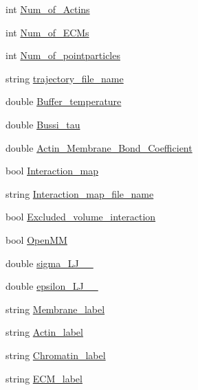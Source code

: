 \begin{DoxyCompactItemize}
\item 
int \mbox{\hyperlink{namespaceGenConst_a74cb3c07acb344ebdeeb885fbdacd13a}{Num\+\_\+of\+\_\+\+Actins}}
\item 
int \mbox{\hyperlink{namespaceGenConst_a70039a764f7a8ef1084d977559fd5c3b}{Num\+\_\+of\+\_\+\+E\+C\+Ms}}
\item 
int \mbox{\hyperlink{namespaceGenConst_aec456997dd27bb5eb5c636fbc78f39fc}{Num\+\_\+of\+\_\+pointparticles}}
\item 
string \mbox{\hyperlink{namespaceGenConst_aadb6de9465987552f3367a893c9f0817}{trajectory\+\_\+file\+\_\+name}}
\item 
double \mbox{\hyperlink{namespaceGenConst_a9deb819215b4b909972f699931e4e155}{Buffer\+\_\+temperature}}
\item 
double \mbox{\hyperlink{namespaceGenConst_aad6835547fc7bc7ef3069986f08e2792}{Bussi\+\_\+tau}}
\item 
double \mbox{\hyperlink{namespaceGenConst_a605feaf5d31899243b6222624163cf29}{Actin\+\_\+\+Membrane\+\_\+\+Bond\+\_\+\+Coefficient}}
\item 
bool \mbox{\hyperlink{namespaceGenConst_ad847e6f5e498c18806f453d643ee8b1e}{Interaction\+\_\+map}}
\item 
string \mbox{\hyperlink{namespaceGenConst_a99a2fa8732b65ec4de1dfaca040a11de}{Interaction\+\_\+map\+\_\+file\+\_\+name}}
\item 
bool \mbox{\hyperlink{namespaceGenConst_a2a8e8f88c2959679b92fc79c94d07ad9}{Excluded\+\_\+volume\+\_\+interaction}}
\item 
bool \mbox{\hyperlink{namespaceGenConst_abcb46238d30411769a54de2a308a9717}{Open\+MM}}
\item 
double \mbox{\hyperlink{namespaceGenConst_a34375d0ec9af3672f5fcbe624044ad8d}{sigma\+\_\+\+L\+J\+\_\+\_}}
\item 
double \mbox{\hyperlink{namespaceGenConst_aed07d4c4a7f92cd150a09f87bdb65b70}{epsilon\+\_\+\+L\+J\+\_\+\_}}
\item 
string \mbox{\hyperlink{namespaceGenConst_acefa162cfa7572ce261245beaa812c9b}{Membrane\+\_\+label}}
\item 
string \mbox{\hyperlink{namespaceGenConst_a9acdda43f7e8ee196130df7f5966e658}{Actin\+\_\+label}}
\item 
string \mbox{\hyperlink{namespaceGenConst_a2614662d6f315ee0639468cb7a42ee0c}{Chromatin\+\_\+label}}
\item 
string \mbox{\hyperlink{namespaceGenConst_a8a4424d53bb365766d5396d7b03df41e}{E\+C\+M\+\_\+label}}
\item 

\end{DoxyCompactItemize}
